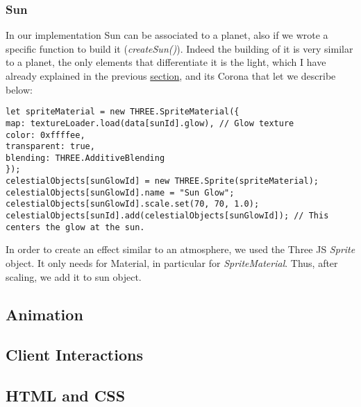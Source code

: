 \documentclass{article}
\begin{document}
\subsubsection{Sun}
In our implementation Sun can be associated to a planet, also if we wrote a specific function to build it (\textit{createSun()}). Indeed the building of it is very similar to a planet, the only elements that differentiate it is the light, which I have already explained in the previous \hyperref[subsec:pointlight]{section}, and its Corona that let we describe below:
\begin{lstlisting}
let spriteMaterial = new THREE.SpriteMaterial({
map: textureLoader.load(data[sunId].glow), // Glow texture
color: 0xffffee,
transparent: true,
blending: THREE.AdditiveBlending
});
celestialObjects[sunGlowId] = new THREE.Sprite(spriteMaterial);
celestialObjects[sunGlowId].name = "Sun Glow";
celestialObjects[sunGlowId].scale.set(70, 70, 1.0);
celestialObjects[sunId].add(celestialObjects[sunGlowId]); // This centers the glow at the sun.
\end{lstlisting}
In order to create an effect similar to an atmosphere, we used the Three JS \textit{Sprite} object. It only needs for Material, in particular for \textit{SpriteMaterial}. Thus, after scaling, we add it to sun object.

\subsection{Animation}

\subsection{Client Interactions}

\subsection{HTML and CSS}
\end{document}
